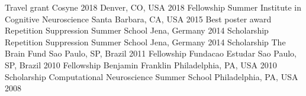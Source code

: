 \begin{cvhonors}
  \cvhonor
    {Travel grant}
    {Cosyne 2018}
    {Denver, CO, USA}
    {2018}
  \cvhonor
    {Fellowship}
    {Summer Institute in Cognitive Neuroscience}
    {Santa Barbara, CA, USA}
    {2015}
  \cvhonor
    {Best poster award}
    {Repetition Suppression Summer School}
    {Jena, Germany}
    {2014}
  \cvhonor
    {Scholarship}
    {Repetition Suppression Summer School}
    {Jena, Germany}
    {2014}
  \cvhonor
    {Scholarship}
    {The Brain Fund}
    {Sao Paulo, SP, Brazil}
    {2011}
  \cvhonor
    {Fellowship}
    {Fundacao Estudar}
    {Sao Paulo, SP, Brazil}
    {2010}
  \cvhonor
    {Fellowship}
    {Benjamin Franklin}
    {Philadelphia, PA, USA}
    {2010}
  \cvhonor
    {Scholarship}
    {Computational Neuroscience Summer School}
    {Philadelphia, PA, USA}
    {2008}
\end{cvhonors}

